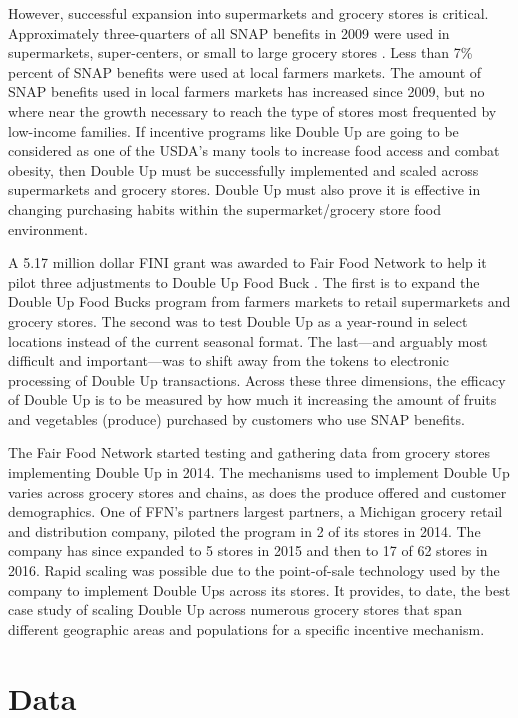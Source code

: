 \documentclass[12pt,letterpaperpaper,]{book}
\begin{document}
However, successful expansion into supermarkets and grocery stores is
critical. Approximately three-quarters of all SNAP benefits in 2009 were
used in supermarkets, super-centers, or small to large grocery stores
\citep{castner_benefit_2011}. Less than 7\% percent of SNAP benefits
were used at local farmers markets. The amount of SNAP benefits used in
local farmers markets has increased since 2009, but no where near the
growth necessary to reach the type of stores most frequented by
low-income families. If incentive programs like Double Up are going to
be considered as one of the USDA's many tools to increase food access
and combat obesity, then Double Up must be successfully implemented and
scaled across supermarkets and grocery stores. Double Up must also prove
it is effective in changing purchasing habits within the
supermarket/grocery store food environment.

A 5.17 million dollar FINI grant was awarded to Fair Food Network to
help it pilot three adjustments to Double Up Food Buck
\citep{usda_nifa_usda_2015}. The first is to expand the Double Up Food
Bucks program from farmers markets to retail supermarkets and grocery
stores. The second was to test Double Up as a year-round in select
locations instead of the current seasonal format. The last---and
arguably most difficult and important---was to shift away from the
tokens to electronic processing of Double Up transactions. Across these
three dimensions, the efficacy of Double Up is to be measured by how
much it increasing the amount of fruits and vegetables (produce)
purchased by customers who use SNAP benefits.

The Fair Food Network started testing and gathering data from grocery
stores implementing Double Up in 2014. The mechanisms used to implement
Double Up varies across grocery stores and chains, as does the produce
offered and customer demographics. One of FFN's partners largest
partners, a Michigan grocery retail and distribution company, piloted
the program in 2 of its stores in 2014. The company has since expanded
to 5 stores in 2015 and then to 17 of 62 stores in 2016. Rapid scaling
was possible due to the point-of-sale technology used by the company to
implement Double Ups across its stores. It provides, to date, the best
case study of scaling Double Up across numerous grocery stores that span
different geographic areas and populations for a specific incentive
mechanism.

\section{Data}\label{data}
\end{document}
